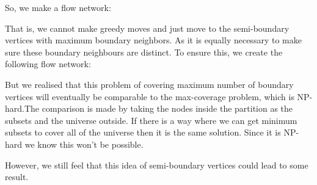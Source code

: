 \documentclass[12pt,a4paper,onecolumn]{article}
\begin{document}
\begin{itemize}
So, we make a flow network:
\begin{figure}
\end{figure}
That is, we cannot make greedy moves and just move to the semi-boundary vertices with maximum boundary neighbors. As it is equally necessary to make sure these boundary neighbours are distinct. To ensure this, we create the following flow network:
\begin{figure}
\end{figure}
But we realised that this problem of covering maximum number of boundary vertices will eventually be comparable to the max-coverage problem, which is NP-hard.The comparison is made by taking the nodes inside the partition as the subsets and the universe outside. If there is a way where we can get minimum subsets to cover all of the universe then it is the same solution. Since it is NP-hard we know this won't be possible.

 However, we still feel that this idea of semi-boundary vertices could lead to some result. 
\end{itemize}
\end{document}
